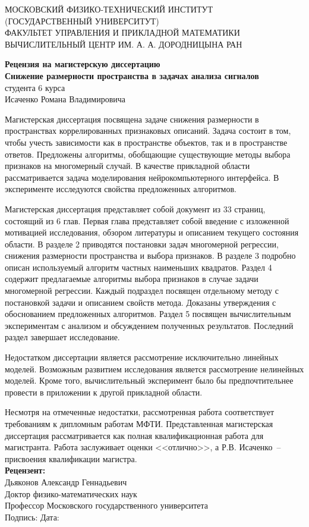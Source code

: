 \documentclass[12pt,oneside]{article}
\theoremstyle{definition}
\begin{document}
	\thispagestyle{empty}
	\begin{center}
		\sc
		МОСКОВСКИЙ ФИЗИКО-ТЕХНИЧЕСКИЙ ИНСТИТУТ \\
		(ГОСУДАРСТВЕННЫЙ УНИВЕРСИТУТ) \\
		ФАКУЛЬТЕТ УПРАВЛЕНИЯ И ПРИКЛАДНОЙ МАТЕМАТИКИ \\
		ВЫЧИСЛИТЕЛЬНЫЙ ЦЕНТР ИМ. А. А. ДОРОДНИЦЫНА РАН\\[1cm]
	\end{center}
\begin{center}
	{\bf
	Рецензия на магистерскую диссертацию \\[2mm]
	Снижение размерности пространства в задачах анализа сигналов} \\ [2mm]
	студента 6 курса \\
	Исаченко Романа Владимировича
\end{center}

Магистерская диссертация посвящена задаче снижения размерности в пространствах коррелированных признаковых описаний. 
Задача состоит в том, чтобы учесть зависимости как в пространстве объектов, так и в пространстве ответов.
Предложены алгоритмы, обобщающие существующие методы выбора признаков на многомерный случай.
В качестве прикладной области рассматривается задача моделирования нейрокомпьютерного интерфейса.
В эксперименте исследуются свойства предложенных алгоритмов.

Магистерская диссертация представляет собой документ из 33 страниц, состоящий из 6 глав.
Первая глава представляет собой введение с изложенной мотивацией исследования, обзором литературы и описанием текущего состояния области. 
В разделе 2 приводятся постановки задач многомерной регрессии, снижения размерности пространства и выбора признаков. 
В разделе 3 подробно описан используемый алгоритм частных наименьших квадратов. 
Раздел 4 содержит предлагаемые алгоритмы выбора признаков в случае задачи многомерной регрессии. 
Каждый подраздел посвящен отдельному методу с постановкой задачи и описанием свойств метода. 
Доказаны утверждения с обоснованием предложенных алгоритмов.
Раздел 5 посвящен вычислительным экспериментам с анализом и обсуждением полученных результатов.
Последний раздел завершает исследование.

Недостатком диссертации является рассмотрение исключительно линейных моделей. 
Возможным развитием исследования является рассмотрение нелинейных моделей. 
Кроме того, вычислительный эксперимент было бы предпочтительнее провести в приложении к другой прикладной области. 

Несмотря на отмеченные недостатки, рассмотренная работа соответствует требованиям к дипломным работам МФТИ.
Представленная магистерская диссертация рассматривается как полная квалификационная работа для магистранта.
Работа заслуживает оценки <<отлично>>, а Р.В. Исаченко~-- присвоения квалификации магистра.
\\[4mm]
{\bf Рецензент:} \\
Дьяконов Александр Геннадьевич \\
Доктор физико-математических наук \\
Профессор Московского государственного университета \\[4mm]
Подпись: \hspace{7cm}Дата:
\end{document}
